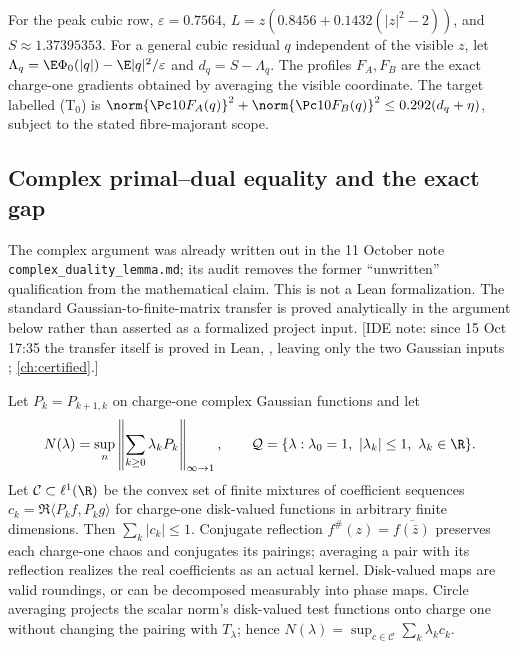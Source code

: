 For the peak cubic row,
$\varepsilon=0.7564$, $L=z(0.8456+0.1432(|z|^2-2))$, and
$S\approx1.37395353$. For a general cubic residual $q$ independent of the
visible $z$, let
$\Lambda_q=\E\Phi_0(|q|)-\E|q|^2/\varepsilon$ and $d_q=S-\Lambda_q$.
The profiles $F_A,F_B$ are the exact charge-one gradients obtained by
averaging the visible coordinate. The target labelled (T$_0$) is
$\norm{\Pc10F_A(q)}^2+\norm{\Pc10F_B(q)}^2
\le0.292(d_q+\eta)$, subject to the stated fibre-majorant scope.

\subsection{Complex primal--dual equality and the exact gap}
\label{sec:complex-duality-proof}
The complex argument was already written out in the 11 October note
\texttt{complex\_duality\_lemma.md}; its audit removes the former
``unwritten'' qualification from the mathematical claim. This is not
a Lean formalization. The standard Gaussian-to-finite-matrix transfer
is proved analytically in the argument below rather than asserted as
a formalized project input. [IDE note: since 15 Oct 17:35 the transfer itself is proved in Lean, , leaving only the two Gaussian inputs ; \autoref{ch:certified}.]

Let $P_k=P_{k+1,k}$ on charge-one complex Gaussian functions and let
\[
N(\lambda)=\sup_n\left\|\sum_{k\ge0}\lambda_kP_k\right\|_{\infty\to1},
\qquad\mathcal Q=\{\lambda:\lambda_0=1,\ |\lambda_k|\le1,
\ \lambda_k\in\R\}.
\]
Let $\mathcal C\subset\ell^1(\R)$ be the convex set of finite mixtures
of coefficient sequences $c_k=\Re\langle P_kf,P_kg\rangle$ for
charge-one disk-valued functions in arbitrary finite dimensions.
Then $\sum_k|c_k|\le1$. Conjugate reflection
$f^\#(z)=\overline{f(\bar z)}$ preserves each charge-one chaos and
conjugates its pairings; averaging a pair with its reflection realizes
the real coefficients as an actual kernel. Disk-valued maps are valid
roundings, or can be decomposed measurably into phase maps.
Circle averaging projects the scalar norm's disk-valued test functions
onto charge one without changing the pairing with $T_\lambda$; hence
$N(\lambda)=\sup_{c\in\mathcal C}\sum_k\lambda_kc_k$.

